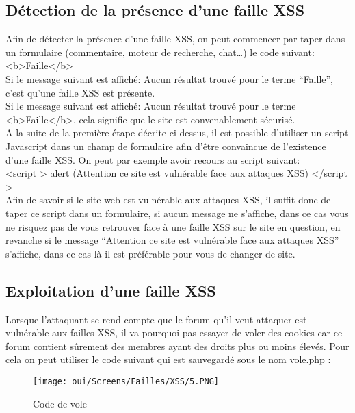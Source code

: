\subsection{Détection de la présence d’une faille XSS}

Afin de détecter la présence d’une faille XSS, on peut commencer par taper dans un formulaire (commentaire, moteur de recherche, chat…) le code suivant:\\
<b>Faille</b>\\
Si le message suivant est affiché: Aucun résultat trouvé pour le terme “Faille”, c’est qu’une faille XSS est présente.\\
Si le message suivant est affiché: Aucun résultat trouvé pour le terme <b>Faille</b>, cela signifie que le site est convenablement sécurisé.\\
A la suite de la première étape décrite ci-dessus, il est possible d’utiliser un script Javascript dans un champ de formulaire afin d’être convaincue de l’existence d’une faille XSS.
On peut par exemple avoir recours au script suivant:\\
<script > alert (Attention ce site est vulnérable face aux attaques XSS) </script >\\
Afin de savoir si le site web est vulnérable aux attaques XSS, il suffit donc de taper ce script dans un formulaire, si aucun message ne s’affiche, dans ce cas vous ne risquez pas de vous retrouver face à une faille XSS sur le site en question, en revanche si le message “Attention ce site est vulnérable face aux attaques XSS” s’affiche, dans ce cas là il est préférable pour vous de changer de site.

\subsection{Exploitation d’une faille XSS}

Lorsque l’attaquant se rend compte que le forum qu’il veut attaquer est vulnérable aux failles XSS, il va pourquoi pas essayer de voler des cookies car ce forum contient sûrement des membres ayant des droits plus ou moins élevés. Pour cela on peut utiliser le code suivant qui est sauvegardé sous le nom vole.php :

\begin{figure}[htp!]
  \centering
  \setlength\figureheight{7cm}
  \setlength\figurewidth{9cm}
  \texttt{[image: oui/Screens/Failles/XSS/5.PNG]}
  \caption{Code de vole}
  \label{fig:courbe-tikz}
\end{figure}

